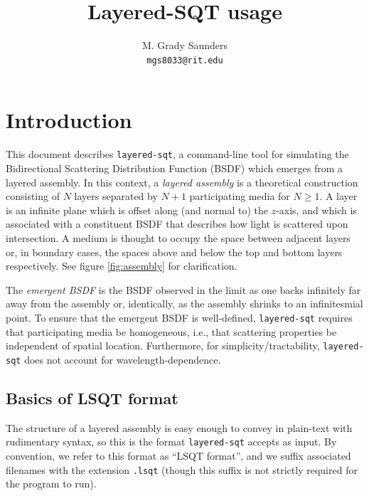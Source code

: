 \documentclass[
    twoside,
    twocolumn,
    letterpaper,
    10pt]{article}
\begin{document}
\title{Layered-SQT usage}
\author{
M. Grady Saunders\\
\texttt{mgs8033@rit.edu}}
\date{}
\maketitle

\section{Introduction}

This document describes \texttt{layered-sqt}, a command-line 
tool for simulating the Bidirectional Scattering Distribution 
Function (BSDF) which emerges from a layered assembly. In this
context, a \emph{layered assembly} is a theoretical construction
consisting of $N$ layers separated by $N+1$ participating media for
$N \ge 1$. A layer is an infinite plane which is offset along (and 
normal to) the $z$-axis, and which is associated with a constituent 
BSDF that describes how light is scattered upon intersection. 
A medium is thought to occupy the space between adjacent layers or, 
in boundary cases, the spaces above and below the top and bottom 
layers respectively. See figure \ref{fig:assembly} for clarification.

The \emph{emergent BSDF} is the BSDF observed in the limit as one backs
infinitely far away from the assembly or, identically, as the assembly
shrinks to an infinitesmial point.
To ensure that the emergent BSDF is well-defined, 
\texttt{layered-sqt} requires that participating media be homogeneous,
i.e., that scattering properties be independent of spatial location. 
Furthermore, for simplicity/tractability, \texttt{layered-sqt} does 
not account for wavelength-dependence.

\subsection{Basics of LSQT format}

The structure of a layered assembly is easy enough to convey 
in plain-text with rudimentary syntax, so this is the format 
\texttt{layered-sqt}
accepts as input. By convention, we refer to this format as
``LSQT format'', and we suffix associated filenames with the extension 
\texttt{.lsqt} (though this suffix is not strictly required for the program
to run). 
\end{document}
